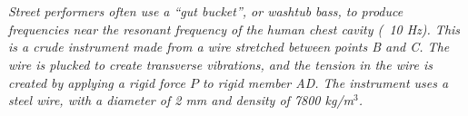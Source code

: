 \section{}

\textit{Street performers often use a “gut bucket”, or washtub bass, to produce frequencies near the resonant frequency of the human chest cavity (~10 Hz). This is a crude instrument made from a wire stretched between points B and C. The wire is plucked to create transverse vibrations, and the tension in the wire is created by applying a rigid force $P$ to rigid member AD. The instrument uses a steel wire, with a diameter of 2 mm and density of 7800 kg/m$^3$.}

